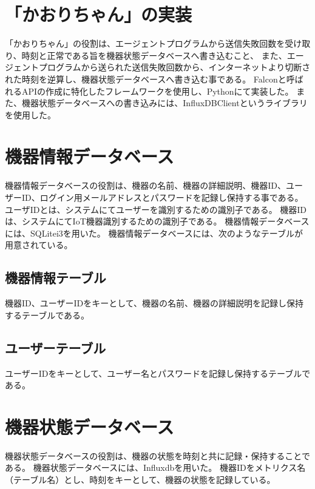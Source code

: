 \section{「かおりちゃん」の実装}
「かおりちゃん」の役割は、エージェントプログラムから送信失敗回数を受け取り、時刻と正常である旨を機器状態データベースへ書き込むこと、
また、エージェントプログラムから送られた送信失敗回数から、インターネットより切断された時刻を逆算し、機器状態データベースへ書き込む事である。
Falconと呼ばれるAPIの作成に特化したフレームワークを使用し、Pythonにて実装した。
また、機器状態データベースへの書き込みには、InfluxDBClientというライブラリを使用した。

\section{機器情報データベース}
機器情報データベースの役割は、機器の名前、機器の詳細説明、機器ID、ユーザーID、ログイン用メールアドレスとパスワードを記録し保持する事である。
ユーザIDとは、システムにてユーザーを識別するための識別子である。
機器IDは、システムにてIoT機器識別するための識別子である。
機器情報データベースには、SQLitei3を用いた。
機器情報データベースには、次のようなテーブルが用意されている。
\subsection{機器情報テーブル}
機器ID、ユーザーIDをキーとして、機器の名前、機器の詳細説明を記録し保持するテーブルである。
\subsection{ユーザーテーブル}
ユーザーIDをキーとして、ユーザー名とパスワードを記録し保持するテーブルである。

\section{機器状態データベース}
機器状態データベースの役割は、機器の状態を時刻と共に記録・保持することである。
機器状態データベースには、Influxdbを用いた。
機器IDをメトリクス名（テーブル名）とし、時刻をキーとして、機器の状態を記録している。

